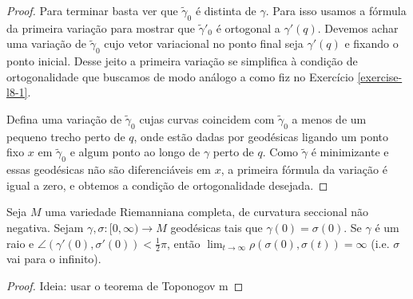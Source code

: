 \begin{proof}
Para terminar basta ver que $\tilde{\gamma}_0$ é distinta de $\gamma$. Para isso
usamos a fórmula da primeira variação para mostrar que $\tilde{\gamma}'_0$ é
ortogonal a $\gamma'(q)$. Devemos achar uma variação de $\tilde{\gamma}_0$ cujo
vetor variacional no ponto final seja $\gamma'(q)$ e fixando o ponto inicial.
Desse jeito a primeira variação se simplifica à condição de ortogonalidade que
buscamos de modo análogo a como fiz no Exercício \ref{exercise-l8-1}.

Defina uma variação de $\tilde{\gamma}_0$ cujas curvas coincidem com
$\tilde{\gamma}_0$ a menos de um pequeno trecho perto de $q$, onde estão dadas
por geodésicas ligando um ponto fixo $x$ em $\tilde{\gamma}_0$ e algum ponto ao
longo de $\gamma$ perto de $q$. Como $\tilde{\gamma}$ é minimizante e essas
geodésicas não são diferenciáveis em $x$, a primeira fórmula da variação é igual
a zero, e obtemos a condição de ortogonalidade desejada.
\end{proof}

\begin{exercise}
\label{exercise-l8-11}
Seja $M$ uma variedade Riemanniana completa, de curvatura seccional não
negativa. Sejam $\gamma,\sigma:[0,\infty) \to M$ geodésicas tais que
$\gamma(0)=\sigma(0)$. Se $\gamma$ é um raio e
$\angle(\gamma'(0),\sigma'(0))<\frac{1}{2}\pi$, então $\lim_{t \to \infty}
\rho(\sigma(0),\sigma(t))=\infty$ (i.e. $\sigma$ vai para o infinito).
\end{exercise}

\begin{proof}
Ideia: usar o teorema de Toponogov  m
\end{proof}

